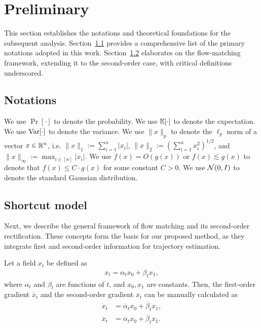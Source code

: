 \section{Preliminary}

This section establishes the notations and theoretical foundations for the subsequent analysis. 
Section~\ref{sec:notation} provides a comprehensive list of the primary notations adopted in this work. Section~\ref{sec:pre_flow_matching} elaborates on the flow-matching framework, extending it to the second-order case, with critical definitions underscored. 

\subsection{Notations}\label{sec:notation}

We use $\Pr[\cdot]$ to denote the probability. We use $\operatorname*{{\mathbb{E}}}[\cdot]$ to denote the expectation. We use $\operatorname*{\mathrm{Var}}[\cdot]$ to denote the variance.
We use $\|x\|_p$ to denote the $\ell_p$ norm of a vector $x \in \mathbb{R}^n$, i.e. $\|x\|_1 := \sum_{i=1}^n |x_i|$, $\|x\|_2 := (\sum_{i=1}^n x_i^2)^{1/2}$, and $\|x\|_{\infty} := \max_{i \in [n]} |x_i|$. 
We use $f(x) = O(g(x))$ or $f(x) \lesssim g(x)$ to denote that $f(x) \leq C\cdot g(x)$ for some constant $C>0$.
We use $\mathcal{N}(0,I)$ to denote the standard Gaussian distribution.

\subsection{Shortcut model}\label{sec:pre_flow_matching}

Next, we describe the general framework of flow matching and its second-order rectification. These concepts form the basis for our proposed method, as they integrate first and second-order information for trajectory estimation.

\begin{fact}\label{fac:one_second_order}
Let a field $x_t$ be defined as 
\begin{align*}
x_t = \alpha_t x_0 + \beta_t x_1,
\end{align*}
where $\alpha_t$ and $\beta_t$ are functions of $t$, and $x_0, x_1$ are constants. Then, the first-order gradient $\dot{x_t}$ and the second-order gradient $\ddot{x_t}$ can be manually calculated as
\begin{align*}
\dot{x}_t &= \dot{\alpha_t} x_0 + \dot{\beta_t} x_1, \\
\ddot{x}_t &= \ddot{\alpha_t} x_0 + \ddot{\beta_t} x_1.
\end{align*}
\end{fact}

